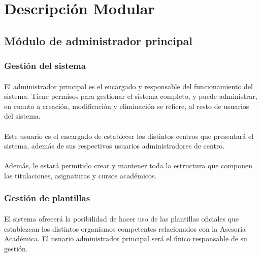 \section{Descripción Modular}\label{descMod}

   \subsection{Módulo de administrador principal}

      \subsubsection{Gestión del sistema}

      \paragraph{}El administrador principal es el encargado y responsable
      del funcionamiento del sistema. Tiene permisos para gestionar el
      sistema completo, y puede administrar, en cuanto a creación, modificación
      y eliminación se refiere, al resto de usuarios del sistema.

      \paragraph{}Este usuario es el encargado de establecer los distintos
      centros que presentará el sistema, además de sus respectivos usuarios
      administradores de centro.

      \paragraph{}Además, le estará permitido crear y mantener toda la
      estructura que componen las titulaciones, asignaturas y cursos
      académicos.

      \subsubsection{Gestión de plantillas}

      \paragraph{}El sistema ofrecerá la posibilidad de hacer uso de las
      plantillas oficiales que establezcan los distintos organismos competentes
      relacionados con la Asesoría Académica. El usuario administrador principal
      será el único responsable de su gestión.

